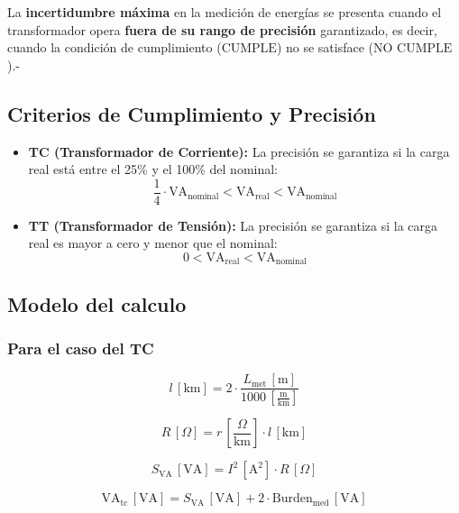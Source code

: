 La \textbf{incertidumbre máxima} en la medición de energías se presenta cuando el transformador opera \textbf{fuera de su rango de precisión} garantizado, es decir, cuando la condición de cumplimiento ($\text{CUMPLE}$) no se satisface ($\text{NO CUMPLE}$).-

\subsection{Criterios de Cumplimiento y Precisión}

\begin{itemize}
    \item \textbf{TC (Transformador de Corriente):} La precisión se garantiza si la carga real está entre el 25\% y el 100\% del nominal:
    $$\frac{1}{4} \cdot \text{VA}_{\text{nominal}} < \text{VA}_{\text{real}} < \text{VA}_{\text{nominal}}$$
    \item \textbf{TT (Transformador de Tensión):} La precisión se garantiza si la carga real es mayor a cero y menor que el nominal:
    $$0 < \text{VA}_{\text{real}} < \text{VA}_{\text{nominal}}$$
\end{itemize}

\subsection{Modelo del calculo}
\subsubsection{Para el caso del TC}

\begin{equation*}
l \, [\text{km}] = 2 \cdot \frac{L_{\text{met}} \, [\text{m}]}{1000 \, [\frac{\text{m}}{\text{km}}]}
\end{equation*}

\begin{equation*}
R \, [\Omega] = r \, [\frac{\Omega}{\text{km}}] \cdot l \, [\text{km}]
\end{equation*}

\begin{equation*}
S_{\text{VA}} \, [\text{VA}] = I^2 \, [\text{A}^2] \cdot R \, [\Omega]
\end{equation*}

\begin{equation*}
\text{VA}_{\text{tc}} \, [\text{VA}] = S_{\text{VA}} \, [\text{VA}] + 2 \cdot \text{Burden}_{\text{med}} \, [\text{VA}]
\end{equation*}

